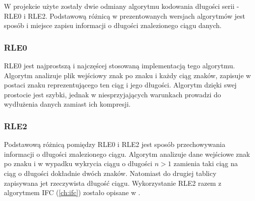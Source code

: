 
W projekcie użyte zostały dwie odmiany algorytmu kodowania długości serii - RLE0 i RLE2. Podstawową różnicą w prezentowanych wersjach algorytmów jest sposób i miejsce zapisu informacji o długości znalezionego ciągu danych.

\subsubsection{RLE0}
RLE0\cite{deorowicz} jest najprostszą i najczęścej stosowaną implementacją tego algorytmu. Algorytm analizuje plik wejściowy znak po znaku i każdy ciąg znaków, zapisuje w postaci znaku reprezentującego ten ciąg i jego długości. Algorytm dzięki swej prostocie jest szybki, jednak w niesprzyjających warunkach prowadzi do wydłużenia danych zamiast ich kompresji.

\subsubsection{RLE2}
Podstawową różnicą pomiędzy RLE0 i RLE2\cite{abel} jest sposób przechowywania informacji o długości znalezionego ciągu. Algorytm analizuje dane wejściowe znak po znaku i w wypadku wykrycia ciągu o długości $n > 1$ zamienia taki ciąg na ciąg o długości dokładnie dwóch  znaków. Natomiast do drugiej tablicy zapisywana jet rzeczywista długość ciągu. Wykorzystanie RLE2 razem z algorytmem IFC (\ref{ch:ifc}) zostało opisane w \cite{abel}.